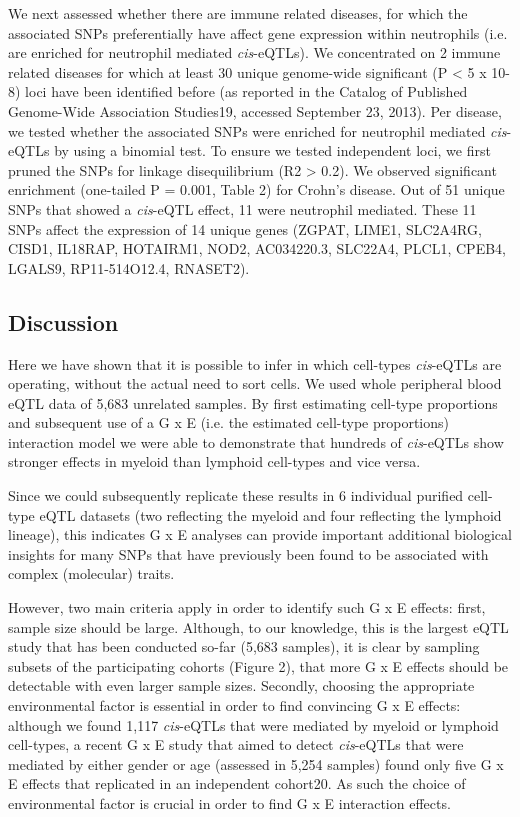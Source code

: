   We next assessed whether there are immune related diseases, for which the associated SNPs 
  preferentially have affect gene expression within neutrophils (i.e. are enriched for neutrophil 
  mediated \emph{cis}-eQTLs).  We concentrated on 2 immune related diseases for which at least 30 unique 
  genome-wide significant (P < 5 x 10-8) loci have been identified before (as reported in the Catalog 
  of Published Genome-Wide Association Studies19, accessed September 23, 2013). Per disease, we tested 
  whether the associated SNPs were enriched for neutrophil mediated \emph{cis}-eQTLs by using a binomial test. 
  To ensure we tested independent loci, we first pruned the SNPs for linkage disequilibrium (R2 > 0.2). 
  We observed significant enrichment (one-tailed P = 0.001, Table 2) for Crohn's disease. Out of 51 
  unique SNPs that showed a \emph{cis}-eQTL effect, 11 were neutrophil mediated. These 11 SNPs affect the 
  expression of 14 unique genes (ZGPAT, LIME1, SLC2A4RG, CISD1, IL18RAP, HOTAIRM1, NOD2, AC034220.3, 
  SLC22A4, PLCL1, CPEB4, LGALS9, RP11-514O12.4, RNASET2).

  \subsection{Discussion}
  Here we have shown that it is possible to infer in which cell-types \emph{cis}-eQTLs are operating, without 
  the actual need to sort cells. We used whole peripheral blood eQTL data of 5,683 unrelated samples. 
  By first estimating cell-type proportions and subsequent use of a G x E (i.e. the estimated cell-type 
  proportions) interaction model we were able to demonstrate that hundreds of \emph{cis}-eQTLs show stronger 
  effects in myeloid than lymphoid cell-types and vice versa. 

  Since we could subsequently replicate these results in 6 individual purified cell-type eQTL datasets 
  (two reflecting the myeloid and four reflecting the lymphoid lineage), this indicates G x E analyses 
  can provide important additional biological insights for many SNPs that have previously been found 
  to be associated with complex (molecular) traits. 

  However, two main criteria apply in order to identify such G x E effects: first, sample size should 
  be large. Although, to our knowledge, this is the largest eQTL study that has been conducted so-far 
  (5,683 samples), it is clear by sampling subsets of the participating cohorts (Figure 2), that more 
  G x E effects should be detectable with even larger sample sizes. Secondly, choosing the appropriate 
  environmental factor is essential in order to find convincing G x E effects: although we found 1,117 
  \emph{cis}-eQTLs that were mediated by myeloid or lymphoid cell-types, a recent G x E study that aimed to 
  detect \emph{cis}-eQTLs that were mediated by either gender or age (assessed in 5,254 samples) found only 
  five G x E effects that replicated in an independent cohort20. As such the choice of environmental 
  factor is crucial in order to find G x E interaction effects.

